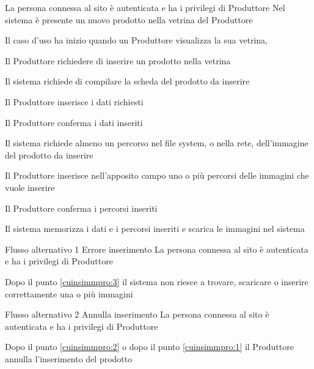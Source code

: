 \tabcuvspace

{}
{La persona connessa al sito è autenticata e ha i privilegi di Produttore}
{Nel sistema è presente un nuovo prodotto nella vetrina del Produttore}
{\begin{enumCU}
		\item Il caso d'uso ha inizio quando un Produttore visualizza la sua vetrina, 
		\item Il Produttore richiedere di inserire un prodotto nella vetrina
		\item Il sistema richiede di compilare la scheda del prodotto da inserire
		\item Il Produttore inserisce i dati richiesti \label{cuinsimmpro:1}
		\item Il Produttore conferma i dati inseriti 
		\item Il sistema richiede almeno un percorso nel file system, o nella rete, dell'immagine del prodotto da inserire
		\item Il Produttore inserisce nell'apposito campo uno o più percorsi  delle immagini che vuole inserire \label{cuinsimmpro:2}
		\item Il Produttore conferma i percorsi inseriti \label{cuinsimmpro:3}
		\item Il sistema memorizza i dati e i percorsi inseriti e scarica le immagini nel sistema
	\end{enumCU}}
%
{Flusso alternativo 1}%
{Errore inserimento}%
{La persona connessa al sito è autenticata e ha i privilegi di Produttore}%
{\postNulle}%
{\begin{enumCU}
		\item Dopo il punto \ref{cuinsimmpro:3} il sistema non riesce a trovare, scaricare o inserire correttamente una o più immagini
	\end{enumCU}}%
%
{Flusso alternativo 2}%
{Annulla inserimento}%
{La persona connessa al sito è autenticata e ha i privilegi di Produttore}%
{\postNulle}%
{\begin{enumCU}
		\item Dopo il punto \ref{cuinsimmpro:2} o dopo il punto \ref{cuinsimmpro:1} il Produttore annulla l'inserimento del prodotto
	\end{enumCU}}%

\tabcuvspace

